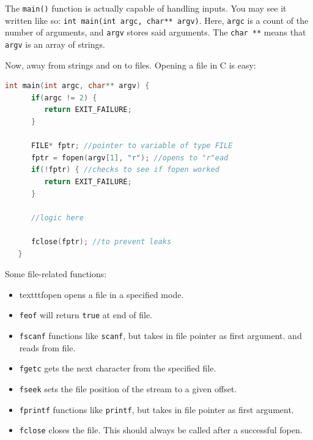 \documentclass[nobib]{tufte-handout}
\begin{document}
The \texttt{main()} function is actually capable of handling inputs. You
may see it written like so: \texttt{int main(int argc, char** argv)}. Here,
\texttt{argc} is a count of the number of arguments, and \texttt{argv} stores
said arguments. The \texttt{char **} means that \texttt{argv} is an array
of strings. 

Now, away from strings and on to files. Opening a file in C is easy:
\begin{lstlisting}[language=C,caption=fopen]
   int main(int argc, char** argv) {
      if(argc != 2) {
         return EXIT_FAILURE;
      }

      FILE* fptr; //pointer to variable of type FILE
      fptr = fopen(argv[1], "r"); //opens to "r"ead
      if(!fptr) { //checks to see if fopen worked
         return EXIT_FAILURE;
      }

      //logic here

      fclose(fptr); //to prevent leaks
   }
\end{lstlisting}
Some file-related functions:
\begin{itemize}
   \item texttt{fopen} opens a file in a specified mode. 
   \item \texttt{feof} will return \texttt{true} at end of file.
   \item \texttt{fscanf} functions like \texttt{scanf}, but takes in file pointer as first argument.
   and reads from file. 
   \item \texttt{fgetc} gets the next character from the specified file. 
   \item \texttt{fseek} sets the file position of the stream to a given offset.
   \item \texttt{fprintf} functions like \texttt{printf}, but takes in file pointer as first argument. 
   \item \texttt{fclose} closes the file. This should always be called after a successful fopen. 
\end{itemize}

\pagebreak 
\end{document}
